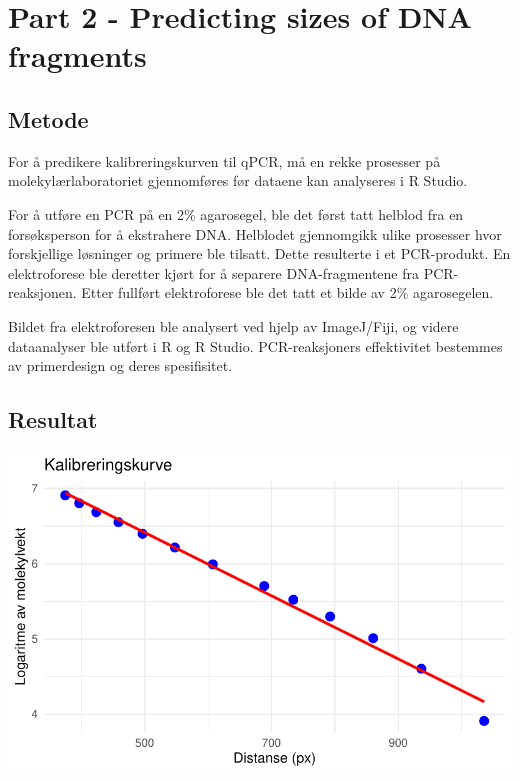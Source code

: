 \documentclass[
  letterpaper,
  DIV=11,
  numbers=noendperiod]{scrreprt}
\begin{document}
\section{Part 2 - Predicting sizes of DNA
fragments}\label{part-2---predicting-sizes-of-dna-fragments}

\subsection{Metode}\label{metode-2}

For å predikere kalibreringskurven til qPCR, må en rekke prosesser på
molekylærlaboratoriet gjennomføres før dataene kan analyseres i R
Studio.

For å utføre en PCR på en 2\% agarosegel, ble det først tatt helblod fra
en forsøksperson for å ekstrahere DNA. Helblodet gjennomgikk ulike
prosesser hvor forskjellige løsninger og primere ble tilsatt. Dette
resulterte i et PCR-produkt. En elektroforese ble deretter kjørt for å
separere DNA-fragmentene fra PCR-reaksjonen. Etter fullført
elektroforese ble det tatt et bilde av 2\% agarosegelen.

Bildet fra elektroforesen ble analysert ved hjelp av ImageJ/Fiji, og
videre dataanalyser ble utført i R og R Studio. PCR-reaksjoners
effektivitet bestemmes av primerdesign og deres spesifisitet.

\subsection{Resultat}\label{resultat-2}

\includegraphics{02-regression-models_files/figure-pdf/unnamed-chunk-3-1.pdf}

\begingroup\fontsize{10}{12}\selectfont
\end{document}
